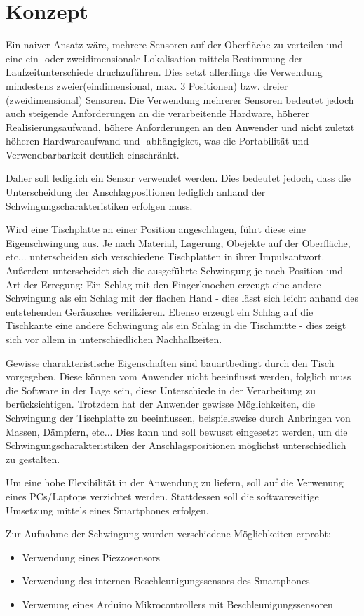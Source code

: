 \section{Konzept}
Ein naiver Ansatz wäre, mehrere Sensoren auf der Oberfläche zu verteilen und eine ein- oder zweidimensionale Lokalisation mittels Bestimmung der Laufzeitunterschiede druchzuführen. Dies setzt allerdings die Verwendung mindestens zweier(eindimensional, max. 3 Positionen) bzw. dreier (zweidimensional) Sensoren. Die Verwendung mehrerer Sensoren bedeutet jedoch auch steigende Anforderungen an die verarbeitende Hardware, höherer Realisierungsaufwand, höhere Anforderungen an den Anwender und nicht zuletzt höheren Hardwareaufwand und -abhängigket, was die Portabilität und Verwendbarbarkeit deutlich einschränkt.

Daher soll lediglich ein Sensor verwendet werden. Dies bedeutet jedoch, dass die Unterscheidung der Anschlagpositionen lediglich anhand der Schwingungscharakteristiken erfolgen muss.

Wird eine Tischplatte an einer Position angeschlagen, führt diese eine Eigenschwingung aus.
Je nach Material, Lagerung, Obejekte auf der Oberfläche, etc... unterscheiden sich verschiedene Tischplatten in ihrer Impulsantwort.
Außerdem unterscheidet sich die ausgeführte Schwingung je nach Position und Art der Erregung: 
Ein Schlag mit den Fingerknochen erzeugt eine andere Schwingung als ein Schlag mit der flachen Hand - dies lässt sich leicht anhand des entstehenden Geräusches verifizieren.
Ebenso erzeugt ein Schlag auf die Tischkante eine andere Schwingung als ein Schlag in die Tischmitte - dies zeigt sich vor allem in unterschiedlichen Nachhallzeiten.

Gewisse charakteristische Eigenschaften sind bauartbedingt durch den Tisch vorgegeben. 
Diese können vom Anwender nicht beeinflusst werden, folglich muss die Software in der Lage sein, diese Unterschiede in der Verarbeitung zu berücksichtigen. 
Trotzdem hat der Anwender gewisse Möglichkeiten, die Schwingung der Tischplatte zu beeinflussen, beispielsweise durch Anbringen von Massen, Dämpfern, etc... 
Dies kann und soll bewusst eingesetzt werden, um die Schwingungscharakteristiken der Anschlagspositionen möglichst unterschiedlich zu gestalten.  

Um eine hohe Flexibilität in der Anwendung zu liefern, soll auf die Verwenung eines PCs/Laptops verzichtet werden. Stattdessen soll die softwareseitige Umsetzung mittels eines Smartphones erfolgen.

Zur Aufnahme der Schwingung wurden verschiedene Möglichkeiten erprobt:
\begin{itemize}
	\item Verwendung eines Piezzosensors
	\item Verwendung des internen Beschleunigungssensors des Smartphones
	\item Verwenung eines Arduino Mikrocontrollers mit Beschleunigungssensoren  
\end{itemize}


